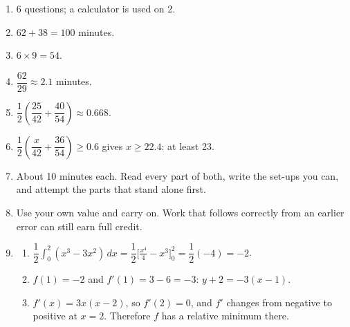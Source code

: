 \documentclass[11pt]{article}
\begin{document}
\newpage
\begin{solbox}
\begin{enumerate}[leftmargin=*,itemsep=4pt]
  \item 6 questions; a calculator is used on 2.
  \item $62+38=100$ minutes.
  \item $6\times9=54$.
  \item $\dfrac{62}{29}\approx2.1$ minutes.
  \item $\dfrac12\left(\dfrac{25}{42}+\dfrac{40}{54}\right)\approx0.668$.
  \item $\dfrac12\left(\dfrac{x}{42}+\dfrac{36}{54}\right)\ge0.6$ gives $x\ge22.4$: at least 23.
  \item About 10 minutes each. Read every part of both, write the set-ups you can, and attempt the parts that stand alone first.
  \item Use your own value and carry on. Work that follows correctly from an earlier error can still earn full credit.
  \item \begin{enumerate}[label=(\alph*),leftmargin=*,itemsep=3pt]
    \item $\dfrac12\displaystyle\int_{0}^{2}(x^3-3x^2)\,dx=\dfrac12\Big[\tfrac{x^4}{4}-x^3\Big]_0^2=\dfrac12(-4)=-2$.
    \item $f(1)=-2$ and $f'(1)=3-6=-3$: $y+2=-3(x-1)$.
    \item $f'(x)=3x(x-2)$, so $f'(2)=0$, and $f'$ changes from negative to positive at $x=2$. Therefore $f$ has a relative minimum there.
  \end{enumerate}
\end{enumerate}
\end{solbox}
\end{document}
